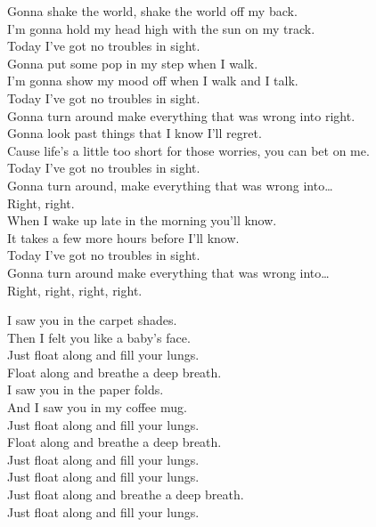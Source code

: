 


Gonna shake the world, shake the world off my back. \\
I'm gonna hold my head high with the sun on my track. \\
Today I've got no troubles in sight. \\

Gonna put some pop in my step when I walk. \\
I'm gonna show my mood off when I walk and I talk. \\
Today I've got no troubles in sight. \\
Gonna turn around make everything that was wrong into right. \\

Gonna look past things that I know I'll regret. \\
Cause life's a little too short for those worries, you can bet on me. \\
Today I've got no troubles in sight. \\
Gonna turn around, make everything that was wrong into… \\
Right, right. \\

When I wake up late in the morning you'll know. \\
It takes a few more hours before I'll know. \\
Today I've got no troubles in sight. \\
Gonna turn around make everything that was wrong into… \\
Right, right, right, right. \\




I saw you in the carpet shades. \\
Then I felt you like a baby's face. \\
Just float along and fill your lungs. \\
Float along and breathe a deep breath. \\

I saw you in the paper folds. \\
And I saw you in my coffee mug. \\
Just float along and fill your lungs. \\
Float along and breathe a deep breath. \\

Just float along and fill your lungs. \\
Just float along and fill your lungs. \\
Just float along and breathe a deep breath. \\
Just float along and fill your lungs. \\
